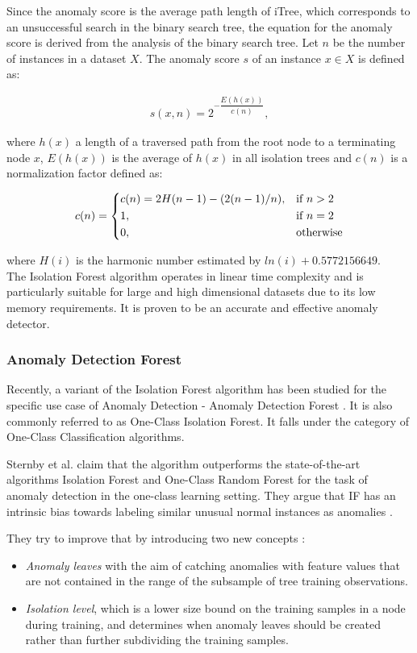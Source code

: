 Since the anomaly score is the average path length of iTree, which corresponds to an unsuccessful search in the binary search tree, the equation for the anomaly score is derived from the analysis of the binary search tree. Let $n$ be the number of instances in a dataset $X$. The anomaly score $s$ of an instance $x \in X$ is defined as:
 
 \begin{gather}
     s(x, n) = 2^{- \dfrac{E(h(x))}{c(n)}},
 \end{gather}
 
 where $h(x)$ a length of a traversed path from the root node to a terminating node $x$, $E(h(x))$ is the average of $h(x)$ in all isolation trees and $c(n)$ is a normalization factor defined as: 
 
 \[
 c(n) = 
  \begin{dcases}
     c(n) = 2H(n - 1) - (2(n - 1) / n), & \text{if } n > 2\\
     1, & \text{if } n = 2\\
     0, & \text{otherwise}
 \end{dcases} 
 \]
 
where $H(i)$ is the harmonic number estimated by $ln(i) + 0.5772156649$. \\

The Isolation Forest algorithm operates in linear time complexity and is particularly suitable for large and high dimensional datasets due to its low memory requirements. It is proven to be an accurate and effective anomaly detector.

\subsubsection*{Anomaly Detection Forest}
Recently, a variant of the Isolation Forest algorithm has been studied for the specific use case of Anomaly Detection - Anomaly Detection Forest \cite{adForest}. It is also commonly referred to as One-Class Isolation Forest. 
It falls under the category of One-Class Classification algorithms.

Sternby et al. claim that the algorithm outperforms the state-of-the-art algorithms Isolation Forest and One-Class Random Forest for the task of anomaly detection in the one-class learning setting. They argue that IF has an intrinsic bias towards labeling similar unusual normal instances as anomalies \cite{adForest}.

They try to improve that by introducing two new concepts \cite{adForest}:
\begin{itemize}
    \item \textit{Anomaly leaves} with the aim of catching anomalies with feature values that are not contained
            in the range of the subsample of tree training observations.
    \item \textit{Isolation level}, which is a lower size bound on the training samples in a node during training, and determines when anomaly leaves should be created rather than further subdividing the training samples.
\end{itemize}

